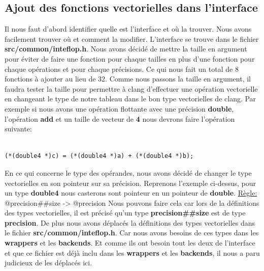 \documentclass[11pt]{article}
\begin{document}
\subsection{Ajout des fonctions vectorielles dans l'interface}
\label{sec:orgc9e1d9f}

Il nous faut d'abord identifier quelle est l'interface et où la
trouver. Nous avons facilement trouver où et comment la
modifier. L'interface se trouve dans le fichier
\textbf{src/common/inteflop.h}.
\vspace{5mm}
Nous avons décidé de mettre la taille en argument pour éviter de
faire une fonction pour chaque tailles en plus d'une fonction pour
chaque opérations et pour chaque précisions. Ce qui nous fait un
total de 8 fonctions à ajouter au lieu de 32.
\vspace{5mm}
Comme nous passons la taille en argument, il faudra tester la
taille pour permettre à clang d'effectuer une opération vectorielle
en changeant le type de notre tableau dans le bon type vectorielles de clang.
\vspace{5mm}
Par exemple si nous avons une opération flottante avec une
précision \textbf{double}, l'opération \textbf{add} et un taille de vecteur
de \textbf{4} nous devrons faire l'opération suivante:

\begin{verbatim}

(*(double4 *)c) = (*(double4 *)a) + (*(double4 *)b);

\end{verbatim}

En ce qui concerne le type des opérandes, nous avons décidé de
changer le type vectorielles en son pointeur sur sa
précision. Reprenons l'exemple ci-dessus, pour un type \textbf{double4}
nous casterons sont pointeur en un pointeur de \textbf{double}.
\vspace{5mm}
\uline{Règle:} @precision\#\#size -> @precision
\vspace{5mm}
Nous pouvons faire cela car lors de la définitions des types
vectorielles, il est précisé qu'un type \textbf{precision\#\#size} est de type
\textbf{precision}.
\vspace{5mm}
De plus nous avons déplacés la définitions des types vectorielles dans le
fichier \textbf{src/common/inteflop.h}. Car nous avons besoins de ces types dans les
\textbf{wrappers} et les \textbf{backends}. Et comme ils ont besoin tout les deux de
l'interface et que ce fichier est déjà inclu dans les \textbf{wrappers} et les
\textbf{backends}, il nous a paru judicieux de les déplacés ici.
\end{document}
